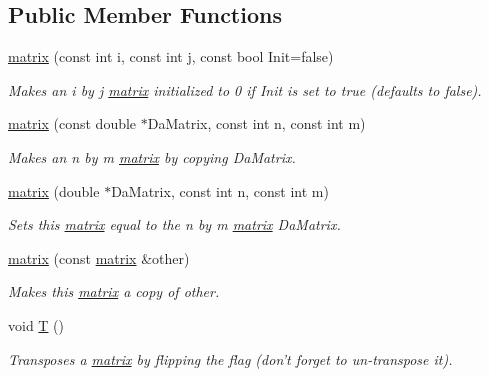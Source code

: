 \subsection*{Public Member Functions}
\begin{DoxyCompactItemize}
\item 
\hyperlink{classJKBuilder_1_1matrix_a7af07ab4ff5c2add0ae9bbf90c06c5d7}{matrix} (const int i, const int j, const bool Init=false)
\begin{DoxyCompactList}\small\item\em Makes an i by j \hyperlink{classJKBuilder_1_1matrix}{matrix} initialized to 0 if Init is set to true (defaults to false). \item\end{DoxyCompactList}\item 
\hyperlink{classJKBuilder_1_1matrix_a89f63b8297dc93a94fb0d221521fce0e}{matrix} (const double $\ast$DaMatrix, const int n, const int m)
\begin{DoxyCompactList}\small\item\em Makes an n by m \hyperlink{classJKBuilder_1_1matrix}{matrix} by copying DaMatrix. \item\end{DoxyCompactList}\item 
\hyperlink{classJKBuilder_1_1matrix_a752ebd9a51439abd10e09ff48df7e180}{matrix} (double $\ast$DaMatrix, const int n, const int m)
\begin{DoxyCompactList}\small\item\em Sets this \hyperlink{classJKBuilder_1_1matrix}{matrix} equal to the n by m \hyperlink{classJKBuilder_1_1matrix}{matrix} DaMatrix. \item\end{DoxyCompactList}\item 
\hyperlink{classJKBuilder_1_1matrix_aff55091606b5db4c54b83a04033182d7}{matrix} (const \hyperlink{classJKBuilder_1_1matrix}{matrix} \&other)
\begin{DoxyCompactList}\small\item\em Makes this \hyperlink{classJKBuilder_1_1matrix}{matrix} a copy of other. \item\end{DoxyCompactList}\item 
void \hyperlink{classJKBuilder_1_1matrix_af2563817f6505e9f8a6ee5c5c209a115}{T} ()
\begin{DoxyCompactList}\small\item\em Transposes a \hyperlink{classJKBuilder_1_1matrix}{matrix} by flipping the flag (don't forget to un-\/transpose it). \item\end{DoxyCompactList}\item 

\end{DoxyCompactItemize}
